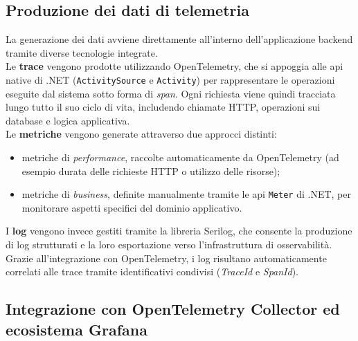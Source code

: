\subsection{Produzione dei dati di telemetria}

La generazione dei dati avviene direttamente all’interno dell’applicazione backend tramite diverse tecnologie integrate.\\
Le \textbf{trace} vengono prodotte utilizzando OpenTelemetry, che si appoggia alle \gls{api} native di .NET (\texttt{ActivitySource} e \texttt{Activity}) per rappresentare le operazioni eseguite dal sistema sotto forma di \textit{span}. Ogni richiesta viene quindi tracciata lungo tutto il suo ciclo di vita, includendo chiamate HTTP, operazioni sui database e logica applicativa.\\
Le \textbf{metriche} vengono generate attraverso due approcci distinti:
\begin{itemize}
      \item metriche di \textit{performance}, raccolte automaticamente da OpenTelemetry (ad esempio durata delle richieste HTTP o utilizzo delle risorse);
      \item metriche di \textit{business}, definite manualmente tramite le \gls{api} \texttt{Meter} di .NET, per monitorare aspetti specifici del dominio applicativo.
\end{itemize}
I \textbf{log} vengono invece gestiti tramite la libreria Serilog, che consente la produzione di log strutturati e la loro esportazione verso l’infrastruttura di osservabilità. Grazie all’integrazione con OpenTelemetry, i log risultano automaticamente correlati alle trace tramite identificativi condivisi (\textit{TraceId} e \textit{SpanId}).

\subsection{Integrazione con OpenTelemetry Collector ed ecosistema Grafana}

